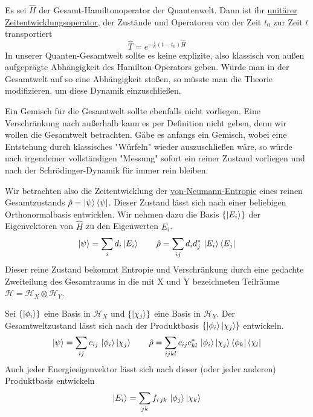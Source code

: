 \documentclass[12pt]{article}
\begin{document}
Es sei $\hat{H}$ der Gesamt-Hamiltonoperator der Quantenwelt. Dann ist ihr \href{https://de.wikipedia.org/wiki/Zeitentwicklungsoperator}{unitärer Zeitentwicklungsoperator}, der Zustände und Operatoren von der Zeit $t_0$ zur Zeit $t$ transportiert
\begin{equation}
\label{eq:propagator}
\hat{T}=e^{-\frac{\mathrm i}{\hbar}(t-t_0)\hat{H}}
\end{equation}
In unserer Quanten-Gesamtwelt sollte es keine explizite, also klassisch von außen aufgeprägte Abhängigkeit des Hamilton-Operators geben. Würde man in der Gesamtwelt auf so eine Abhängigkeit stoßen, so müsste man die Theorie modifizieren, um diese Dynamik einzuschließen.

Ein Gemisch für die Gesamtwelt sollte ebenfalls nicht vorliegen. Eine Verschränkung nach außerhalb kann es per Definition nicht geben, denn wir wollen die Gesamtwelt betrachten. Gäbe es anfangs ein Gemisch, wobei eine Entstehung durch klassisches "Würfeln" wieder auszuschließen wäre, so würde nach irgendeiner vollständigen "Messung" sofort ein reiner Zustand vorliegen und nach der Schrödinger-Dynamik für immer rein bleiben. 

Wir betrachten also die Zeitentwicklung der \href{https://de.wikipedia.org/wiki/Entropie#Von-Neumann-Entropie}{von-Neumann-Entropie} eines reinen Gesamtzustands $\hat{\rho}=\ket{\psi}\bra{\psi}$. Dieser Zustand lässt sich nach einer beliebigen Orthonormalbasis entwicklen. Wir nehmen dazu die Basis $\{\ket{E_i}\}$ der Eigenvektoren von $\hat{H}$ zu den Eigenwerten $E_i$.
\begin{equation}
\label{eq:psi_energy}
\ket{\psi}=\sum_{i}d_{i}\ket{E_i} \quad\quad
\hat{\rho}=\sum_{ij}d_{i}d_{j}^*\, \ket{E_i}\bra{E_j}
\end{equation}
Dieser reine Zustand bekommt Entropie und Verschränkung durch eine gedachte Zweiteilung des Gesamtraums in die mit X und Y bezeichneten Teilräume $\mathscr{H} = \mathscr{H}_X\otimes\mathscr{H}_Y$.

Sei $\{\ket{\phi_i}\}$ eine Basis in $\mathscr{H}_X$ und $\{\ket{\chi_j}\}$ eine Basis in $\mathscr{H}_Y$. Der Gesamtweltzustand lässt sich nach der Produktbasis $\{\ket{\phi_i}\ket{\chi_j}\}$ entwickeln.
\begin{equation}
\label{eq:psi_product}
\ket{\psi}=\sum_{ij}c_{ij}\, \ket{\phi_i}\ket{\chi_j} \quad\quad
\hat{\rho}=\sum_{ijkl}c_{ij}c_{kl}^*\, \ket{\phi_i}\ket{\chi_j}\bra{\phi_k}\bra{\chi_l}
\end{equation}
Auch jeder Energieeigenvektor lässt sich nach dieser (oder jeder anderen) Produktbasis entwickeln
\begin{equation}
\label{eq:energy_eigenvector}
\ket{E_i}=\sum_{jk}f_{i\,jk}\, \ket{\phi_j}\ket{\chi_k}
\end{equation}
\end{document}
